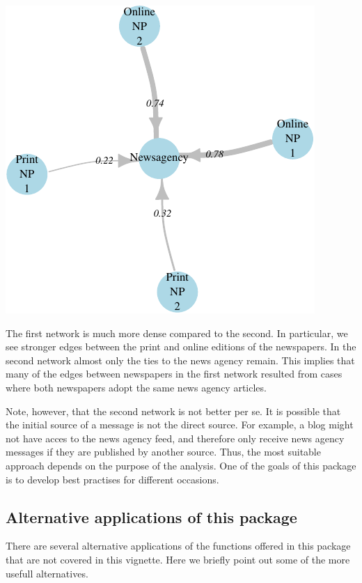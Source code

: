 \documentclass[]{article}
\begin{document}
\begin{center}\includegraphics{vignette_files/figure-latex/unnamed-chunk-21-1} \end{center}

The first network is much more dense compared to the second. In
particular, we see stronger edges between the print and online editions
of the newspapers. In the second network almost only the ties to the
news agency remain. This implies that many of the edges between
newspapers in the first network resulted from cases where both
newspapers adopt the same news agency articles.

Note, however, that the second network is not better per se. It is
possible that the initial source of a message is not the direct source.
For example, a blog might not have acces to the news agency feed, and
therefore only receive news agency messages if they are published by
another source. Thus, the most suitable approach depends on the purpose
of the analysis. One of the goals of this package is to develop best
practises for different occasions.

\subsection{Alternative applications of this
package}\label{alternative-applications-of-this-package}

There are several alternative applications of the functions offered in
this package that are not covered in this vignette. Here we briefly
point out some of the more usefull alternatives.
\end{document}
